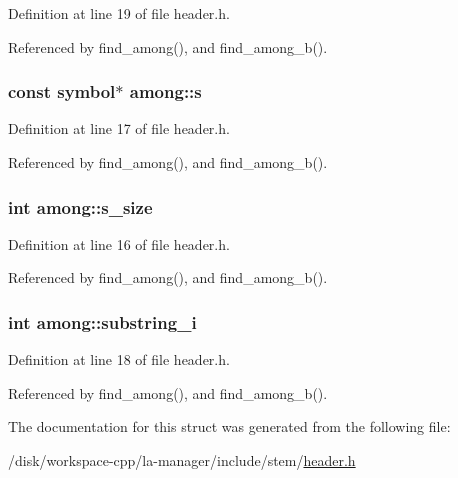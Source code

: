 Definition at line 19 of file header.h.

Referenced by find\_\-among(), and find\_\-among\_\-b().\hypertarget{structamong_65bb5a8443fbadd3361d34f539fafd6e}{
\subsubsection[{s}]{\setlength{\rightskip}{0pt plus 5cm}const {\bf symbol}$\ast$ {\bf among::s}}}
\label{structamong_65bb5a8443fbadd3361d34f539fafd6e}




Definition at line 17 of file header.h.

Referenced by find\_\-among(), and find\_\-among\_\-b().\hypertarget{structamong_6306033b3dac70733b6369d8c857fa17}{
\subsubsection[{s\_\-size}]{\setlength{\rightskip}{0pt plus 5cm}int {\bf among::s\_\-size}}}
\label{structamong_6306033b3dac70733b6369d8c857fa17}




Definition at line 16 of file header.h.

Referenced by find\_\-among(), and find\_\-among\_\-b().\hypertarget{structamong_51cda31a957593437c642a1572454131}{
\subsubsection[{substring\_\-i}]{\setlength{\rightskip}{0pt plus 5cm}int {\bf among::substring\_\-i}}}
\label{structamong_51cda31a957593437c642a1572454131}




Definition at line 18 of file header.h.

Referenced by find\_\-among(), and find\_\-among\_\-b().

The documentation for this struct was generated from the following file:\begin{CompactItemize}
\item 
/disk/workspace-cpp/la-manager/include/stem/\hyperlink{header_8h}{header.h}\end{CompactItemize}
